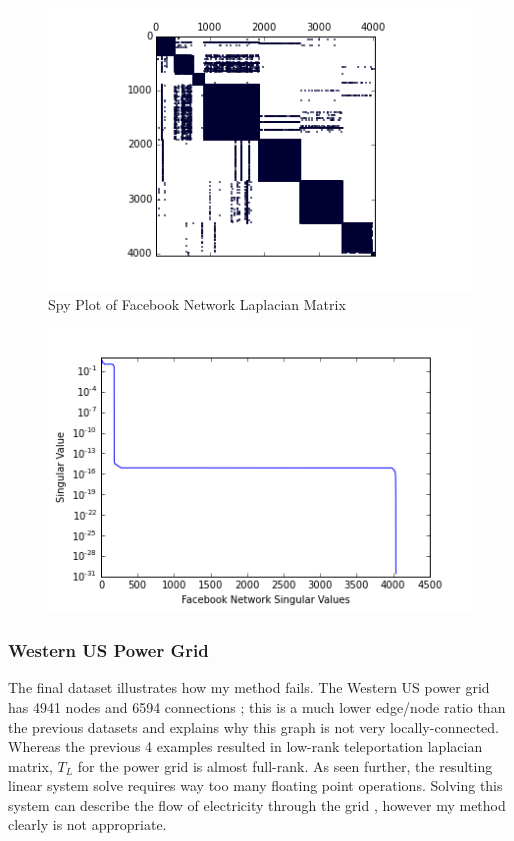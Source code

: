 \documentclass{article}
\begin{document}
\begin{figure}
\centering
\includegraphics[width = \linewidth]{fbspy.png}
\caption{Spy Plot of Facebook Network Laplacian Matrix}
\end{figure}
\begin{figure}
\centering
\includegraphics[width = \linewidth]{fbsing.png}
\end{figure}

\subsubsection{Western US Power Grid}
The final dataset illustrates how my method fails. The Western US power grid has 4941 nodes and 6594 connections \cite{Watts:1998}; this is a much lower edge/node ratio than the previous datasets and explains why this graph is not very locally-connected. Whereas the previous 4 examples resulted in low-rank teleportation laplacian matrix, $T_L$ for the power grid is almost full-rank. As seen further, the resulting linear system solve requires way too many floating point operations. Solving this system can describe the flow of electricity through the grid \cite{Pagani:2013}, however my method clearly is not appropriate. 
\end{document}
